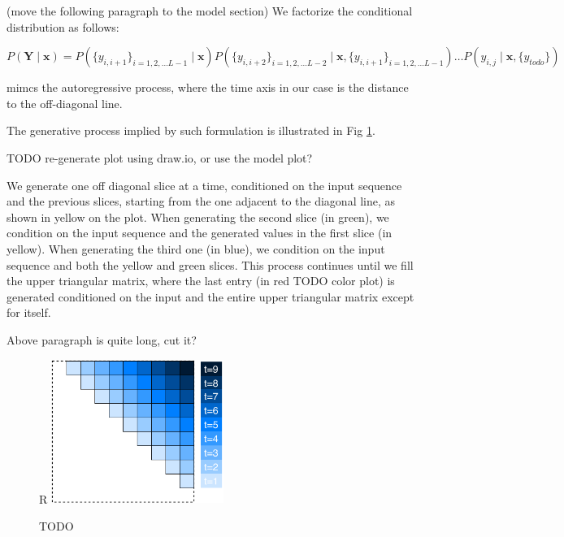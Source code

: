 \documentclass{article}
\begin{document}

(move the following paragraph to the model section)
We factorize the conditional distribution as follows:

$$
P(\bm{Y} \mid \bm{x}) = P(\{y_{i, i+1}\}_{i=1, 2, \dots L-1} \mid \bm{x})
P(\{y_{i, i+2}\}_{i=1, 2, \dots L-2} \mid \bm{x}, \{y_{i, i+1}\}_{i=1, 2, \dots L-1})
\dots
P(y_{i, j} \mid \bm{x}, \{y_{todo}\})
$$

mimcs the autoregressive process, where the time axis in our case is the distance to the off-diagonal line.

The generative process implied by such formulation is illustrated in Fig \ref{fig:autoregressive_direction}.

TODO re-generate plot using draw.io, or use the model plot?

We generate one off diagonal slice at a time, conditioned on the input sequence and the previous slices,
starting from the one adjacent to the diagonal line, as shown in yellow on the plot.
When generating the second slice (in green), we condition on the input sequence and the generated values in the first slice (in yellow).
When generating the third one (in blue), we condition on the input sequence and both the yellow and green slices.
This process continues until we fill the upper triangular matrix,
where the last entry (in red TODO color plot) is generated conditioned on the input and the entire upper triangular matrix except for itself.

Above paragraph is quite long, cut it?

\begin{figure}{R}
    \centering
    \includegraphics[width=0.5\textwidth]{plot/autoregressive_direction.pdf}
    \caption{TODO}
    \label{fig:autoregressive_direction}
    \centering
\end{figure}
\end{document}
